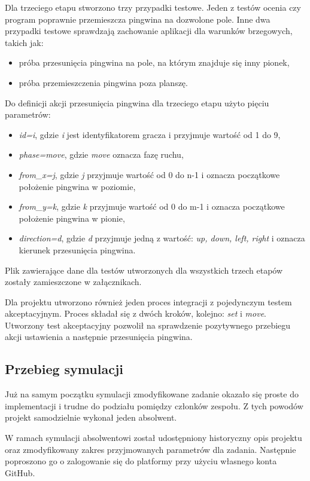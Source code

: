 Dla trzeciego etapu stworzono trzy przypadki testowe.
Jeden z testów ocenia czy program poprawnie przemieszcza pingwina na dozwolone pole.
Inne dwa przypadki testowe sprawdzają zachowanie aplikacji dla warunków brzegowych, takich jak:
\begin{itemize}
    \item próba przesunięcia pingwina na pole, na którym znajduje się inny pionek,
    \item próba przemieszczenia pingwina poza planszę.
\end{itemize}

Do definicji akcji przesunięcia pingwina dla trzeciego etapu użyto pięciu parametrów:
\begin{itemize}
    \item \textit{id=i}, gdzie \textit{i} jest identyfikatorem gracza i przyjmuje wartość od 1 do 9,
    \item \textit{phase=move}, gdzie \textit{move} oznacza fazę ruchu,
    \item \textit{from\_x=j}, gdzie \textit{j} przyjmuje wartość od 0 do n-1 i oznacza początkowe położenie pingwina w poziomie,
    \item \textit{from\_y=k}, gdzie \textit{k} przyjmuje wartość od 0 do m-1 i oznacza początkowe położenie pingwina w pionie,
    \item \textit{direction=d}, gdzie \textit{d} przyjmuje jedną z wartość: \textit{up, down, left, right} i oznacza kierunek przesunięcia pingwina.
\end{itemize}

Plik zawierające dane dla testów utworzonych dla wszystkich trzech etapów zostały zamieszczone w załącznikach.

Dla projektu utworzono również jeden proces integracji z pojedynczym testem akceptacyjnym.
Proces składał się z dwóch kroków, kolejno: \textit{set} i \textit{move}.
Utworzony test akceptacyjny pozwolił na sprawdzenie pozytywnego przebiegu akcji ustawienia a następnie przesunięcia pingwina.

\subsection{Przebieg symulacji}
\label{penguins_simulation}
Już na samym początku symulacji zmodyfikowane zadanie okazało się proste do implementacji i trudne do podziału pomiędzy członków zespołu.
Z tych powodów projekt samodzielnie wykonał jeden absolwent.

W ramach symulacji absolwentowi został udostępniony historyczny opis projektu oraz zmodyfikowany zakres przyjmowanych parametrów dla zadania.
Następnie poproszono go o zalogowanie się do platformy przy użyciu własnego konta GitHub.

